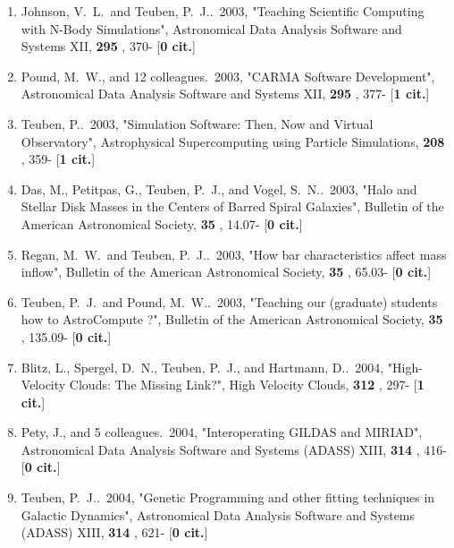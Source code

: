 \documentclass[11pt,letterpaper]{article}
\begin{document}
\begin{enumerate}[resume,label=\textbf{\arabic*}.]
\item  
Johnson, V.~L.~and Teuben, P.~J..\  2003,  "Teaching Scientific Computing 
with N-Body Simulations", Astronomical Data Analysis Software and Systems 
XII,  {\bf 295} , 370- [{\bf 0 cit.}] 

\item  
Pound, M.~W., and 12 colleagues.\  2003,  "CARMA Software Development", 
Astronomical Data Analysis Software and Systems XII,  {\bf 295} , 377- 
[{\bf 1 cit.}] 

\item  
Teuben, P..\  2003,  "Simulation Software: Then, Now and Virtual 
Observatory", Astrophysical Supercomputing using Particle Simulations,  
{\bf 208} , 359- [{\bf 1 cit.}] 

\item  
Das, M., Petitpas, G., Teuben, P.~J., and Vogel, S.~N..\  2003,  "Halo and 
Stellar Disk Masses in the Centers of Barred Spiral Galaxies", Bulletin of 
the American Astronomical Society,  {\bf 35} , 14.07- [{\bf 0 cit.}] 

\item  
Regan, M.~W.~and Teuben, P.~J..\  2003,  "How bar characteristics affect 
mass inflow", Bulletin of the American Astronomical Society,  {\bf 35} , 
65.03- [{\bf 0 cit.}] 

\item  
Teuben, P.~J.~and Pound, M.~W..\  2003,  "Teaching our (graduate) students 
how to AstroCompute ?", Bulletin of the American Astronomical Society,  
{\bf 35} , 135.09- [{\bf 0 cit.}] 

\item  
Blitz, L., Spergel, D.~N., Teuben, P.~J., and Hartmann, D..\  2004,  
"High-Velocity Clouds: The Missing Link?", High Velocity Clouds,  {\bf 312} 
, 297- [{\bf 1 cit.}] 

\item  
Pety, J., and 5 colleagues.\  2004,  "Interoperating GILDAS and MIRIAD", 
Astronomical Data Analysis Software and Systems (ADASS) XIII,  {\bf 314} , 
416- [{\bf 0 cit.}] 

\item  
Teuben, P.~J..\  2004,  "Genetic Programming and other fitting techniques 
in Galactic Dynamics", Astronomical Data Analysis Software and Systems 
(ADASS) XIII,  {\bf 314} , 621- [{\bf 0 cit.}] 


\end{enumerate}
\end{document}
